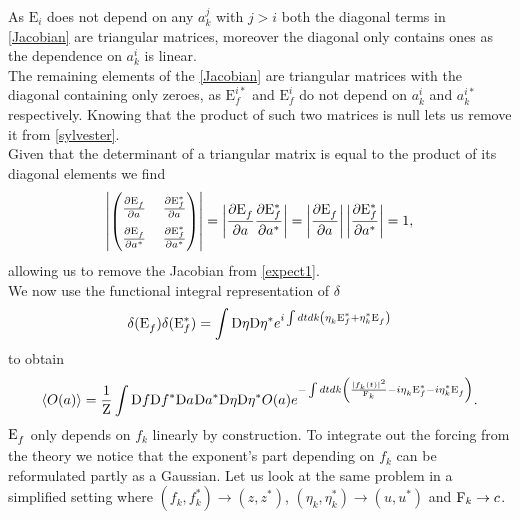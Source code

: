As $\mathrm{E}_i$ does not depend on any $a_k^{j}$ with $j > i$ both the diagonal terms in \eqref{Jacobian} are triangular matrices, moreover the diagonal only contains 
ones as the dependence on $a_k^{i}$ is linear. \\
The remaining elements of the \eqref{Jacobian} are triangular matrices with the diagonal containing only zeroes, as
$\mathrm{E}_f^{i*}$ and  $\mathrm{E}_f^{i}$ do not depend on $a_k^{i}$  and $a_k^{i*}$ respectively. Knowing that the product of such two matrices is null lets us remove it 
from \eqref{sylvester}. \\
Given that the determinant of a triangular matrix is equal to the product of its diagonal elements we find 
\begin{equation}
    \renewcommand{\arraystretch}{1.8}  %
    \setlength{\arraycolsep}{6pt}     %
    \left|
    \begin{pmatrix}
        \frac{\partial \Ef}{\partial \anorm}  & \frac{\partial \Efstar}{\partial \anorm} \\
        \frac{\partial \Ef}{\partial \astar}  & \frac{\partial \Efstar}{\partial \astar}
    \end{pmatrix}
    \right|
    = \left| \frac{\partial \Ef}{\partial \anorm} \frac{\partial \Efstar}{\partial \astar}\right|
    = \left| \frac{\partial \Ef}{\partial \anorm} \right| \left|\frac{\partial \Efstar}{\partial \astar}\right|
    = 1,
\end{equation} 
allowing us to remove the Jacobian from \eqref{expect1}.\\
We now use the functional integral representation of $\delta$
\begin{equation}
    \delta(\mathrm{E}_f^{})\delta(\mathrm{E}_f^*) = \int \mathrm{D} \eta\mathrm{D} \eta^* e^{i\int dt dk\left( \eta_k^{}\mathrm{E}_f^* +\eta_k^* \mathrm{E}_f^{}\right)}
\end{equation}
to obtain 
\begin{equation}
    \langle O(a) \rangle = \frac{1}{\mathrm{Z}}\int \mathrm{D} f \mathrm{D} f^* \mathrm{D} a^{} \mathrm{D}a^{*}\mathrm{D} \eta\mathrm{D} \eta^*  O(a)
    e^{-\int dt dk \left( \frac{|f_k(t)|^2}{\mathrm{F}_k} - i\eta_k^{}\mathrm{E}_f^* -i\eta_k^* \mathrm{E}_f^{} \right)}.
    \label{expect2}
\end{equation}
$\mathrm{E}_f^{}$ only depends on $f_k$ linearly by construction. To integrate out the forcing from the theory we notice that the exponent's part depending on $f_k$
can be reformulated partly as a Gaussian. 
Let us look at the same problem in a simplified setting where $(f_k^{},f_k^*)  \rightarrow (z, z^*)$, $(\eta_k^{}, \eta_k^*) \rightarrow (u, u^*)$ and $\mathrm{F}_k \rightarrow c$.
